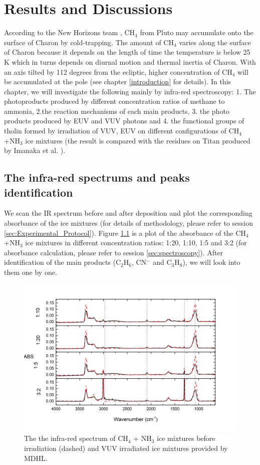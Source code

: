 \chapter{\protect Results and Discussions}
\label{results}
According to the New Horizons team \cite{grundy2016formation}, CH$_4$ from Pluto may accumulate onto the surface of Charon by cold-trapping. The amount of CH$_4$ varies along the surface of Charon because it depends on the length of time the temperature is below 25 K which in turns depends on diurnal motion and thermal inertia of Charon. With an axis tilted by 112 degrees from the ecliptic, higher concentration of CH$_4$ will be accumulated at the pole (see chapter \ref{introduction} for details). In this chapter, we will investigate the following mainly by infra-red spectroscopy: 1. The photoproducts produced by different concentration ratios of methane to ammonia, 2.the reaction mechanisms of each main products, 3. the photo products produced by EUV and VUV photons and 4. the functional groups of tholin formed by irradiation of VUV, EUV on different configurations of CH$_4$+NH$_3$ ice mixtures (the result is compared with the residues on Titan produced by Imanaka et al. \cite{imanaka2004laboratory}).

\section{The infra-red spectrums and peaks identification}
We scan the IR spectrum before and after deposition and plot the corresponding absorbance of the ice mixtures (for details of methodology, please refer to session \ref{sec:Experimental_Protocol}). Figure \ref{fig:widerange} is a plot of the absorbance of the CH$_4$+NH$_3$ ice mixtures in different concentration ratios: 1:20, 1:10, 1:5 and 3:2 (for absorbance calculation, please refer to session \ref{sec:spectroscopy}). After identification of the main products (C$_2$H$_6$, CN$^-$ and C$_3$H$_8$), we will look into them one by one.\\

\begin{figure}
\centering
\includegraphics[width=\textwidth]{figures/chapter3/widerange.png}
\caption{The the infra-red spectrum of CH$_4$ + NH$_3$ ice mixtures before irradiation (dashed) and VUV irradiated ice mixtures provided by MDHL. }
\label{fig:widerange}
\end{figure}

